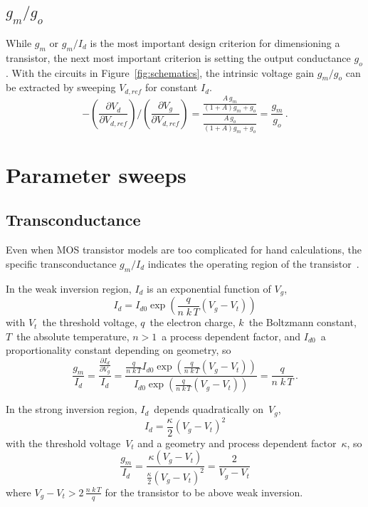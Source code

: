\documentclass[journal]{IEEEtran}
\def\le{\left}
\def\ri{\right}
\begin{document}
\subsection{$g_m/g_o$}
%
While $g_m$ or $g_m/I_d$ is the most important design criterion for dimensioning a transistor,
the next most important criterion is setting the output conductance $g_o$. 
With the circuits in Figure~\ref{fig:schematics}, 
the intrinsic voltage gain $g_m/g_o$ can be extracted by sweeping $V_{d,ref}$ for constant $I_d$.
\begin{equation}\label{egn:gm_over_go}
-\le(\frac{\partial V_d}{\partial V_{d,ref}}\ri)
/\le(\frac{\partial V_g}{\partial V_{d,ref}}\ri)
= \frac{\frac{A\,g_m}{\le(1+A\ri)g_m+g_o}}{\frac{A\,g_o}{\le(1+A\ri)g_m+g_o}} 
= \frac{g_m}{g_o} \,.
\end{equation}

\section{Parameter sweeps}
\subsection{Transconductance}
%
Even when MOS transistor models are too complicated for hand calculations,
the specific transconductance $g_m/I_d$ indicates
the operating region of the transistor~\cite{Silveira1996}.
 
In the weak inversion region, $I_d$ is an exponential function of $V_g$,
\begin{equation}
I_d = I_{d{0}} \exp\le(\frac{q}{n\;k\,T}\le(V_g-V_t\ri)\ri)
\end{equation}
with $V_t$~the threshold voltage, $q$~the electron charge, $k$~the Boltzmann constant, 
$T$~the absolute temperature, $n>1$~a process dependent factor, 
and $I_{d{0}}$~a proportionality constant depending on geometry,
so
\begin{equation}
\frac{g_m}{I_d}
= \frac{\frac{\partial I_d}{\partial V_g}}{I_d} 
= \frac{\frac{q}{n\;k\,T} I_{d{0}} \exp\le(\frac{q}{n\;k\,T}\le(V_g-V_t\ri)\ri)}
       {I_{d{0}} \exp\le(\frac{q}{n\;k\,T}\le(V_g-V_t\ri)\ri)}
= \frac{q}{n\;k\,T}\,.
\end{equation}

In the strong inversion region, $I_d$~depends quadratically on~$V_g$,
\begin{equation}
I_d = \frac{\kappa}{2}\le(V_g-V_t\ri)^2
\end{equation}
with the threshold voltage~$V_t$ and a geometry and process dependent factor~$\kappa$,
so 
\begin{equation}
\frac{g_m}{I_d}
= \frac{\kappa\le(V_g-V_t\ri)}{\frac{\kappa}{2}\le(V_g-V_t\ri)^2}
= \frac{2}{V_g-V_t}
\end{equation}
where $V_g-V_t > 2\,\frac{n\;k\,T}{q}$ for the transistor to be above weak inversion.
\end{document}
